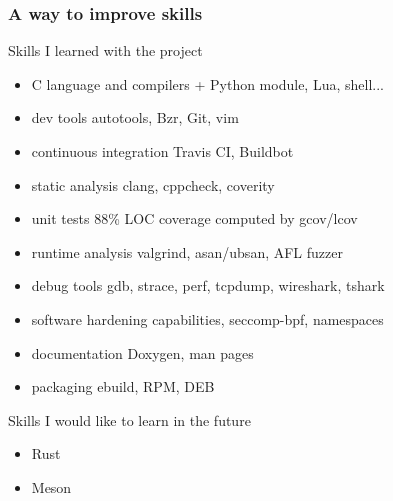 \documentclass[utf8]{beamer}
\begin{document}
\begin{frame}
	\frametitle{A way to improve skills}
	\begin{block}{Skills I learned with the project}
		\scriptsize
		\begin{itemize}
			\item C language and compilers {\tiny + Python module, Lua, shell...}
			\item dev tools {\tiny autotools, Bzr, Git, vim}
			\item continuous integration {\tiny Travis CI, Buildbot}
			\item static analysis {\tiny clang, cppcheck, coverity}
			\item unit tests {\tiny 88\% LOC coverage computed by gcov/lcov}
			\item runtime analysis {\tiny valgrind, asan/ubsan, AFL fuzzer}
			\item debug tools {\tiny gdb, strace, perf, tcpdump, wireshark, tshark}
			\item software hardening {\tiny capabilities, seccomp-bpf, namespaces}
			\item documentation {\tiny Doxygen, man pages}
			\item packaging {\tiny ebuild, RPM, DEB}
		\end{itemize}
	\end{block}
	\begin{block}{Skills I would like to learn in the future}
		\scriptsize
		\begin{itemize}
			\item Rust
			\item Meson
		\end{itemize}
	\end{block}
\end{frame}


\end{document}
